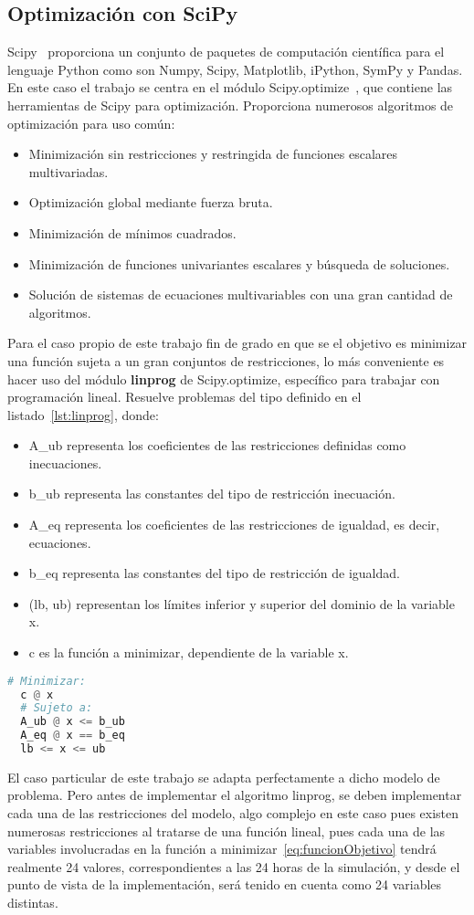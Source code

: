 \subsection{Optimización con SciPy}
Scipy~\cite{Scip} proporciona un conjunto de paquetes de computación científica para el lenguaje Python como son Numpy, Scipy, Matplotlib, iPython, SymPy y Pandas. En este caso el trabajo se centra en el módulo Scipy.optimize~\cite{SciOp}, que contiene las herramientas de Scipy para optimización. Proporciona numerosos algoritmos de optimización para uso común:
\begin{itemize}
\item Minimización sin restricciones y restringida de funciones escalares multivariadas.
\item Optimización global mediante fuerza bruta.
\item Minimización de mínimos cuadrados.
\item Minimización de funciones univariantes escalares y búsqueda de soluciones.
\item Solución de sistemas de ecuaciones multivariables con una gran cantidad de algoritmos.
\end{itemize}
Para el caso propio de este trabajo fin de grado en que se el objetivo es minimizar una función sujeta a un gran conjuntos de restricciones, lo más conveniente es hacer uso del módulo \textbf{linprog} de Scipy.optimize, específico para trabajar con programación lineal. Resuelve problemas del tipo definido en el listado~\ref{lst:linprog}, donde:
\begin{itemize}
\item A\_ub representa los coeficientes de las restricciones definidas como inecuaciones.
\item b\_ub representa las constantes del tipo de restricción inecuación.
\item A\_eq representa los coeficientes de las restricciones de igualdad, es decir, ecuaciones.
\item b\_eq representa las constantes del tipo de restricción de igualdad.
\item (lb, ub) representan los límites inferior y superior del dominio de la variable x.
\item c es la función a minimizar, dependiente de la variable x.
\end{itemize}
\begin{lstlisting}[language=Python,float=ht,numbers=none,caption={Tipo de problema aplicable a Scipy.optimize.linprog},label={lst:linprog}]
  # Minimizar:
  c @ x
  # Sujeto a:
  A_ub @ x <= b_ub
  A_eq @ x == b_eq
  lb <= x <= ub
\end{lstlisting}
El caso particular de este trabajo se adapta perfectamente a dicho modelo de problema. Pero antes de implementar el algoritmo linprog, se deben implementar cada una de las restricciones del modelo, algo complejo en este caso pues existen numerosas restricciones al tratarse de una función lineal, pues cada una de las variables involucradas en la función a minimizar~\ref{eq:funcionObjetivo} tendrá realmente 24 valores, correspondientes a las 24 horas de la simulación, y desde el punto de vista de la implementación, será tenido en cuenta como 24 variables distintas.\\

